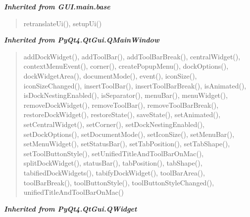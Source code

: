 \large{\textbf{\textit{Inherited from GUI.main.base}}}

\begin{quote}
retranslateUi(), setupUi()
\end{quote}

\large{\textbf{\textit{Inherited from PyQt4.QtGui.QMainWindow}}}

\begin{quote}
addDockWidget(), addToolBar(), addToolBarBreak(), centralWidget(), contextMenuEvent(), corner(), createPopupMenu(), dockOptions(), dockWidgetArea(), documentMode(), event(), iconSize(), iconSizeChanged(), insertToolBar(), insertToolBarBreak(), isAnimated(), isDockNestingEnabled(), isSeparator(), menuBar(), menuWidget(), removeDockWidget(), removeToolBar(), removeToolBarBreak(), restoreDockWidget(), restoreState(), saveState(), setAnimated(), setCentralWidget(), setCorner(), setDockNestingEnabled(), setDockOptions(), setDocumentMode(), setIconSize(), setMenuBar(), setMenuWidget(), setStatusBar(), setTabPosition(), setTabShape(), setToolButtonStyle(), setUnifiedTitleAndToolBarOnMac(), splitDockWidget(), statusBar(), tabPosition(), tabShape(), tabifiedDockWidgets(), tabifyDockWidget(), toolBarArea(), toolBarBreak(), toolButtonStyle(), toolButtonStyleChanged(), unifiedTitleAndToolBarOnMac()
\end{quote}

\large{\textbf{\textit{Inherited from PyQt4.QtGui.QWidget}}}

